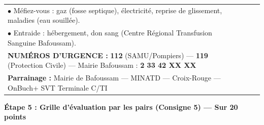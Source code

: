 \documentclass[11pt]{article}
\begin{document}
\begin{exoresolu}
\begin{center}
\begin{tabularx}{\linewidth}{|X|X|X|}
$\bullet$ Méfiez-vous : gaz (fosse septique), électricité, reprise de glissement, maladies (eau souillée). \\
$\bullet$ Entraide : hébergement, don sang (Centre Régional Transfusion Sanguine Bafoussam). \\
\vspace{0.3cm}
\textbf{NUMÉROS D'URGENCE :} \textbf{112} (SAMU/Pompiers) --- \textbf{119} (Protection Civile) --- Mairie Bafoussam : \textbf{2 33 42 XX XX} \\
\textbf{Parrainage :} Mairie de Bafoussam --- MINATD --- Croix-Rouge --- OnBuch+ SVT Terminale C/TI
\end{tabularx}
\end{center}

\textbf{Étape 5 : Grille d'évaluation par les pairs (Consigne 5) — Sur 20 points}


\end{exoresolu}
\end{document}
